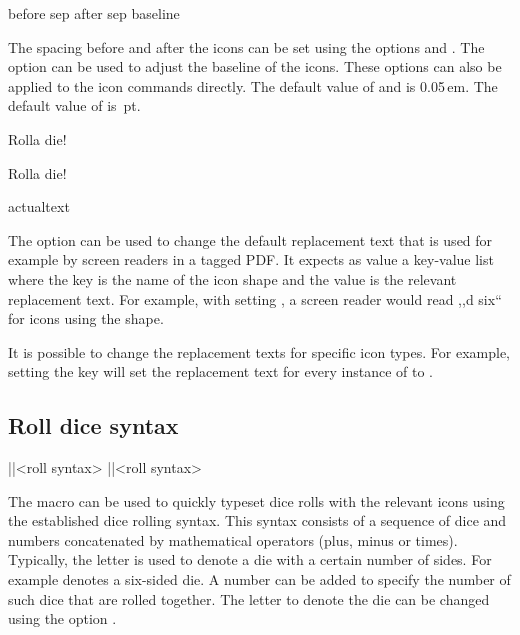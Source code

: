 \documentclass[a4paper]{article}
\begin{document}
\begin{macrodef}
before sep
after sep
baseline
\end{macrodef}
The spacing before and after the icons can be set using the options  and . The option  can be used to adjust the baseline of the icons. These options can also be applied to the icon commands directly. The default value of  and  is 0.05\,em. The default value of  is \,pt.

\begin{codeexample}
Rolla die!

Rolla die!
\end{codeexample}

\begin{macrodef}
actualtext
\end{macrodef}
The option  can be used to change the default replacement text that is used for example by screen readers in a tagged PDF. It expects as value a key-value list where the key is the name of the icon shape and the value is the relevant replacement text. For example, with setting , a screen reader would read ,,d six`` for icons using the  shape.

It is possible to change the replacement texts for specific icon types. For example, setting the key  will set the replacement text for every instance of  to .

\subsection{Roll dice syntax}\label{sec:roll-dice-syntax}

\begin{macrodef}
|\roll|{<roll syntax>}
|\RPGIconsRoll|{<roll syntax>}
\end{macrodef}
The \macro{\roll} macro can be used to quickly typeset dice rolls with the relevant icons using the established dice rolling syntax. This syntax consists of a sequence of dice and numbers concatenated by mathematical operators (plus, minus or times). Typically, the letter  is used to denote a die with a certain number of sides. For example  denotes a six-sided die. A number can be added to specify the number of such dice that are rolled together. The letter to denote the die can be changed using the option .
\end{document}
